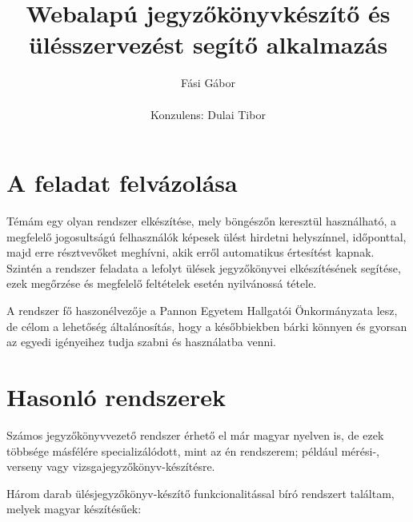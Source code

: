 \documentclass[a4paper,12pt,oneside]{report}
\title{\textbf{Webalapú jegyzőkönyvkészítő és ülésszervezést segítő alkalmazás}}
\author{Fási Gábor\\\\Konzulens: Dulai Tibor}
\date{}
\begin{document}
\setcounter{chapter}{1}

\maketitle

\tableofcontents
\thispagestyle{empty}
\pagebreak

\setcounter{page}{1}
\section{A feladat felvázolása}

Témám egy olyan rendszer elkészítése, mely böngészőn keresztül használható, a megfelelő jogosultságú felhasználók képesek ülést hirdetni helyszínnel, időponttal, majd erre résztvevőket meghívni, akik erről automatikus értesítést kapnak. Szintén a rendszer feladata a lefolyt ülések jegyzőkönyvei elkészítésének segítése, ezek megőrzése és megfelelő feltételek esetén nyilvánossá tétele.

A rendszer fő haszonélvezője a Pannon Egyetem Hallgatói Önkormányzata lesz, de célom a lehetőség általánosítás, hogy a későbbiekben bárki könnyen és gyorsan az egyedi igényeihez tudja szabni és használatba venni.

\section{Hasonló rendszerek}

Számos jegyzőkönyvvezető rendszer érhető el már magyar nyelven is, de ezek többsége másfélére specializálódott, mint az én rendszerem; például mérési-, verseny vagy vizsgajegyzőkönyv-készítésre.

Három darab ülésjegyzőkönyv-készítő funkcionalitással bíró rendszert találtam, melyek magyar készítésűek:
\end{document}

